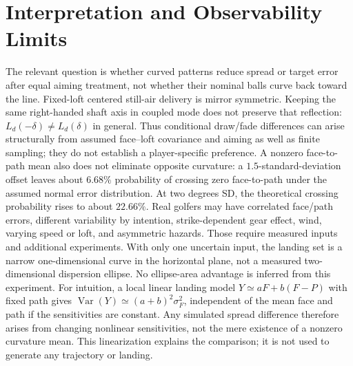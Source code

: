 \documentclass[11pt,letterpaper]{article}
\begin{document}
\section{Interpretation and Observability Limits}
The relevant question is whether curved patterns reduce spread or target
error after equal aiming treatment, not whether their nominal balls curve
back toward the line. Fixed-loft centered still-air delivery is mirror symmetric. Keeping the same
right-handed shaft axis in coupled mode does not preserve that reflection:
$L_d(-\delta)\ne L_d(\delta)$ in general. Thus conditional draw/fade
differences can arise structurally from assumed face--loft covariance and aiming
as well as finite sampling; they do not establish a player-specific preference. A nonzero face-to-path mean also does
not eliminate opposite curvature: a $1.5$-standard-deviation offset leaves
about $6.68\%$ probability of crossing zero face-to-path under the assumed
normal error distribution. At two degrees SD, the theoretical crossing
probability rises to about $22.66\%$. Real golfers may have correlated face/path
errors, different variability by intention, strike-dependent gear effect,
wind, varying speed or loft, and asymmetric hazards. Those require measured
inputs and additional experiments.
With only one uncertain input, the landing set is a narrow one-dimensional
curve in the horizontal plane, not a measured two-dimensional dispersion
ellipse. No ellipse-area advantage is inferred from this experiment.
For intuition, a local linear landing model
$Y\simeq aF+b(F-P)$ with fixed path gives
$\operatorname{Var}(Y)\simeq(a+b)^2\sigma_F^2$, independent of the mean
face and path if the sensitivities are constant. Any simulated spread
difference therefore arises from changing nonlinear sensitivities, not the
mere existence of a nonzero curvature mean. This linearization explains the
comparison; it is not used to generate any trajectory or landing.
\end{document}
